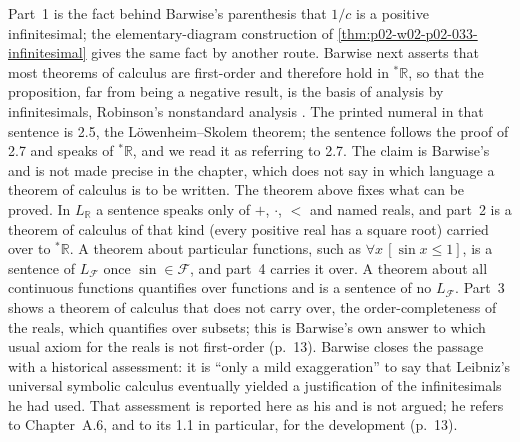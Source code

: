 Part~1 is the fact behind Barwise's parenthesis that \(1/c\) is a positive
infinitesimal; the elementary-diagram construction of
\cref{thm:p02-w02-p02-033-infinitesimal} gives the same fact by another
route.  Barwise next asserts that most theorems of calculus are
first-order and therefore hold in \({}^*\mathbb R\), so that the
proposition, far from being a negative result, is the basis of analysis by
infinitesimals, Robinson's nonstandard analysis
\cite[ch.~A.1, \S2, pp.~12--13]{Barwise1977FirstOrder}.  The printed
numeral in that sentence is 2.5, the L\"owenheim--Skolem theorem; the
sentence follows the proof of 2.7 and speaks of \({}^*\mathbb R\), and we
read it as referring to 2.7.  The claim is Barwise's and is not made
precise in the chapter, which does not say in which language a theorem of
calculus is to be written.  The theorem above fixes what can be proved.
In \(L_{\mathbb R}\) a sentence speaks only of \(+\), \(\cdot\), \(<\) and
named reals, and part~2 is a theorem of calculus of that kind (every
positive real has a square root) carried over to \({}^*\mathbb R\).  A
theorem about particular functions, such as \(\forall x\,[\sin x\leq1]\),
is a sentence of \(L_{\mathcal F}\) once \(\sin\in\mathcal F\), and part~4
carries it over.  A theorem about all continuous functions quantifies over
functions and is a sentence of no \(L_{\mathcal F}\).  Part~3 shows a
theorem of calculus that does not carry over, the order-completeness of
the reals, which quantifies over subsets; this is Barwise's own answer to
which usual axiom for the reals is not first-order (p.~13).  Barwise
closes the passage with a historical assessment: it is ``only a mild
exaggeration'' to say that Leibniz's universal symbolic calculus
eventually yielded a justification of the infinitesimals he had used.
That assessment is reported here as his and is not argued; he refers to
Chapter~A.6, and to its 1.1 in particular, for the development (p.~13).

